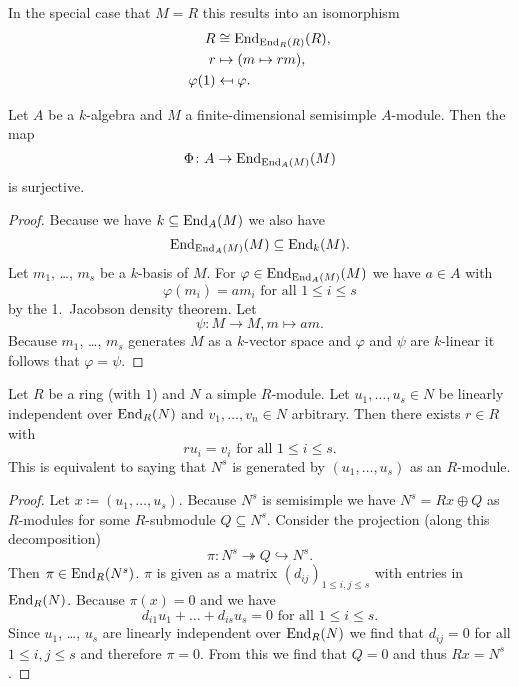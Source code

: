 \begin{rem}
  In the special case that $M = R$ this results into an isomorphism
  \begin{align*}
                R
    &\cong      \operatorname{End}_{\operatorname{End}_R(R)}(R), \\
                r
    &\mapsto    (m \mapsto rm), \\
                \varphi(1)
    &\mapsfrom  \varphi.
  \end{align*}
\end{rem}


\begin{cor}
  Let $A$ be a $k$-algebra and $M$ a finite-dimensional semisimple $A$-module.
  Then the map
  \[
            \Phi
    \colon  A
    \to     \operatorname{End}_{\operatorname{End}_A(M)}(M)
  \]
  is surjective.
\end{cor}
\begin{proof}
  Because we have $k \subseteq \operatorname{End}_A(M)$ we also have
  \[
              \operatorname{End}_{\operatorname{End}_A(M)}(M)
    \subseteq \operatorname{End}_k(M).
  \]
  Let $m_1$, \dots, $m_s$ be a $k$-basis of $M$.
  For $\varphi \in \operatorname{End}_{\operatorname{End}_A(M)}(M)$ we have $a \in A$ with
  \[
      \varphi(m_i)
    = a m_i
    \text{ for all }
    1 \leq i \leq s
  \]
  by the 1.\ Jacobson density theorem.
  Let
  \[
            \psi
    \colon  M \to M,
            m
    \mapsto am.
  \]
  Because $m_1$, \dots, $m_s$ generates $M$ as a $k$-vector space and $\varphi$ and $\psi$ are $k$-linear it follows that $\varphi = \psi$.
\end{proof}


\begin{thrm}
  Let $R$ be a ring (with $1$) and $N$ a simple $R$-module.
  Let $u_1, \dotsc, u_s \in N$ be linearly independent over $\operatorname{End}_R(N)$ and $v_1, \dotsc, v_n \in N$ arbitrary.
  Then there exists $r \in R$ with
  \[
      r u_i
    = v_i
    \text{ for all }
    1 \leq i \leq s.
  \]
  This is equivalent to saying that $N^s$ is generated by $(u_1, \dotsc, u_s)$ as an $R$-module.
\end{thrm}


\begin{proof}
  Let $x \coloneqq (u_1, \dotsc, u_s)$.
  Because $N^s$ is semisimple we have $N^s = Rx \oplus Q$ as $R$-modules for some $R$-submodule $Q \subseteq N^s$.
  Consider the projection (along this decomposition)
  \[
                        \pi
    \colon              N^s
    \twoheadrightarrow  Q
    \hookrightarrow     N^s.
  \]
  Then $\pi \in \operatorname{End}_R(N^s)$.
  $\pi$ is given as a matrix $(d_{ij})_{1 \leq i,j \leq s}$ with entries in $\operatorname{End}_R(N)$.
  Because $\pi(x) = 0$ and we have
  \[
      d_{i1} u_1 + \dotsc + d_{is} u_s
    = 0
    \text{ for all }
    1 \leq i \leq s.
  \]
  Since $u_1$, \dots, $u_s$ are linearly independent over $\operatorname{End}_R(N)$ we find that $d_{ij} = 0$ for all $1 \leq i,j \leq s$ and therefore $\pi = 0$.
  From this we find that $Q = 0$ and thus $Rx = N^s$.
\end{proof}


